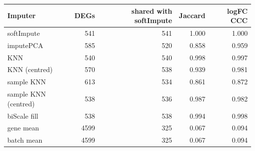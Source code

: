 \begin{tabular}{@{}lrrrr@{}}
\toprule
\textbf{Imputer} & \textbf{DEGs} & \textbf{shared with softImpute} & \textbf{Jaccard} & \textbf{logFC CCC} \\
\midrule
softImpute & 541 & 541 & 1.000 & 1.000 \\
imputePCA & 585 & 520 & 0.858 & 0.959 \\
KNN & 540 & 540 & 0.998 & 0.997 \\
KNN (centred) & 570 & 538 & 0.939 & 0.981 \\
sample KNN & 613 & 534 & 0.861 & 0.872 \\
sample KNN (centred) & 538 & 536 & 0.987 & 0.982 \\
biScale fill & 538 & 538 & 0.994 & 0.998 \\
gene mean & 4599 & 325 & 0.067 & 0.094 \\
batch mean & 4599 & 325 & 0.067 & 0.094 \\
\bottomrule
\end{tabular}
